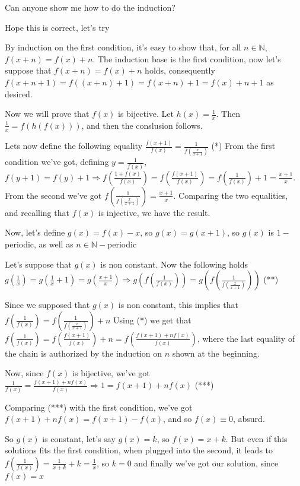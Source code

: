 \begin{mysolution}
	Can anyone show me how to do the induction?
\end{mysolution}



\begin{mysolution}
	Hope this is correct, let's try

By induction on the first condition, it's easy to show that, for all $n\in\mathbb N$, $f(x+n)=f(x)+n$. The induction base is the first condition, now let's suppose that $f(x+n)=f(x)+n$ holds, consequently $f(x+n+1)=f((x+n)+1)=f(x+n)+1=f(x)+n+1$ as desired.

Now we will prove that $f(x)$ is bijective. Let $h(x)=\frac{1}{x}$. Then $\frac{1}{x}=f(h(f(x)))$, and then the conslusion follows.

Lets now define the following equality $\frac{f(x+1)}{f(x)}=\frac{1}{f(\frac{x}{x+1})}$ (*)
From the first condition we've got, defining $y=\frac{1}{f(x)}$, $f(y+1)=f(y)+1\Rightarrow f(\frac{1+f(x)}{f(x)})=f(\frac{f(x+1)}{f(x)})=f(\frac{1}{f(x)})+1=\frac{x+1}{x}$. From the second we've got $f(\frac{1}{f(\frac{x}{x+1})})=\frac{x+1}{x}$. Comparing the two equalities, and recalling that $f(x)$ is injective, we have the result.

Now, let's define $g(x)=f(x)-x$, so $g(x)=g(x+1)$, so $g(x)$ is $1-$periodic, as well as $n\in\mathbb N-$periodic

Let's suppose that $g(x)$ is non constant. Now the following holds $g(\frac{1}{x})=g(\frac{1}{x}+1)=g(\frac{x+1}{x})\Rightarrow g(f(\frac{1}{f(x)}))=g(f(\frac{1}{f(\frac{x}{x+1})}))$ (**)

Since we supposed that $g(x)$ is non constant, this implies that $f(\frac{1}{f(x)})=f(\frac{1}{f(\frac{x}{x+1})})+n$
Using (*) we get that $f(\frac{1}{f(x)})=f(\frac{f(x+1)}{f(x)})+n=f(\frac{f(x+1)+nf(x)}{f(x)})$, where the last equality of the chain is authorized by the induction on $n$ shown at the beginning.

Now, since $f(x)$ is bijective, we've got $\frac{1}{f(x)}=\frac{f(x+1)+nf(x)}{f(x)}\Rightarrow 1=f(x+1)+nf(x)$ (***)

Comparing (***) with the first condition, we've got $f(x+1)+nf(x)=f(x+1)-f(x)$, and so $f(x)\equiv 0$, absurd.

So $g(x)$ is constant, let's say $g(x)=k$, so $f(x)=x+k$. But even if this solutions fits the first condition, when plugged into the second, it leads to $f(\frac{1}{f(x)})=\frac{1}{x+k}+k=\frac{1}{x}$, so $k=0$ and finally we've got our solution, since $\boxed{f(x)=x}$
\end{mysolution}



